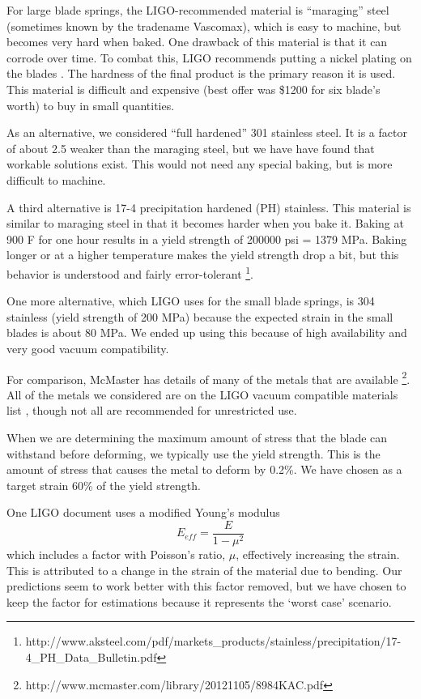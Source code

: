 For large blade springs, the LIGO-recommended material is ``maraging'' steel (sometimes known by the tradename Vascomax), which is easy to machine, but becomes very hard when baked.  One drawback of this material is that it can corrode over time.  To combat this, LIGO recommends putting a nickel plating on the blades \cite{E0900023}.  The hardness of the final product is the primary reason it is used.  This material is difficult and expensive (best offer was \$1200 for six blade's worth) to buy in small quantities.  

As an alternative, we considered ``full hardened'' 301 stainless steel.  It is a factor of about 2.5 weaker than the maraging steel, but we have have found that workable solutions exist. This would not need any special baking, but is more difficult to machine.

A third alternative is 17-4 precipitation hardened (PH) stainless.  This material is similar to maraging steel in that it becomes harder when you bake it.  Baking at 900 F for one hour results in a yield strength of 200000 psi = 1379 MPa.  Baking longer or at a higher temperature makes the yield strength drop a bit, but this behavior is understood and fairly error-tolerant \footnote{http://www.aksteel.com/pdf/markets\_products/stainless/precipitation/17-4\_PH\_Data\_Bulletin.pdf}.

One more alternative, which LIGO uses for the small blade springs, is 304 stainless (yield strength of 200 MPa) because the expected strain in the small blades is about 80 MPa. We ended up using this because of high availability and very good vacuum compatibility.

For comparison, McMaster has details of many of the metals that are available \footnote{http://www.mcmaster.com/library/20121105/8984KAC.pdf}. All of the metals we considered are on the LIGO vacuum compatible materials list \cite{E960050}, though not all are recommended for unrestricted use.

When we are determining the maximum amount of stress that the blade can withstand before deforming, we typically use the yield strength.  This is the amount of stress that causes the metal to deform by 0.2\%.  We have chosen as a target strain 60\% of the yield strength.

One LIGO document \cite{T0900324} uses a modified Young's modulus 
\begin{equation}
E_{eff} = \frac{E}{1-\mu^2}
\label{eq:Eeff}
\end{equation}
which includes a factor with Poisson's ratio, $\mu$, effectively increasing the strain.  This is attributed to a change in the strain of the material due to bending.  Our predictions seem to work better with this factor removed, but we have chosen to keep the factor for estimations because it represents the `worst case' scenario.  



